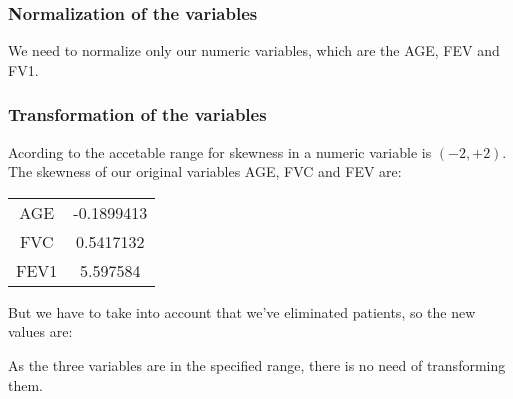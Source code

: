 \subsubsection{Normalization of the variables}
We need to normalize only our numeric variables, which are the AGE, FEV and FV1.


\subsubsection{Transformation of the variables}
Acording to  the accetable range for skewness in a numeric
variable is $(-2, +2)$. The skewness of our original variables AGE, FVC and FEV are:

\begin{center}
\begin{tabular}{| c | c |}
  \hline
  AGE & -0.1899413 \\
  FVC & 0.5417132 \\
  FEV1 & 5.597584 \\
  \hline
\end{tabular}
\end{center}

But we have to take into account that we've eliminated  patients, so the
new values are:


As the three variables are in the specified range, there is no need of
transforming them.




